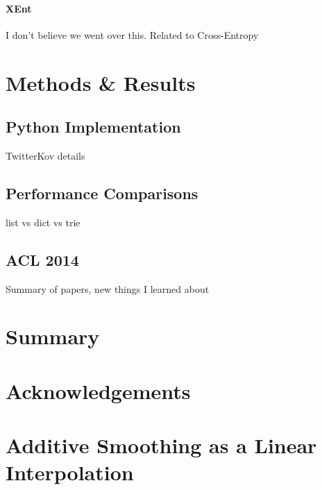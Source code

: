 \documentclass[11pt]{article}
\begin{document}
\paragraph{XEnt}

{\color{red} I don't believe we went over this. Related to Cross-Entropy}

\section{Methods \& Results}

\subsection{Python Implementation}

{\color{red} TwitterKov details}

\subsection{Performance Comparisons}

{\color{red} list vs dict vs trie}

\subsection{ACL 2014}

{\color{red} Summary of papers, new things I learned about}

\section{Summary}

\section{Acknowledgements}




\appendix
\section{Additive Smoothing as a Linear Interpolation}
\end{document}
